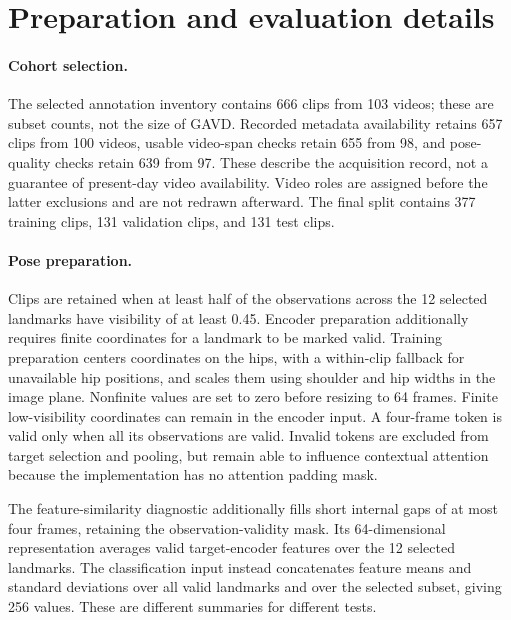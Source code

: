 \documentclass{article}
\begin{document}
\clearpage



\clearpage
\appendix
\section{Preparation and evaluation details}
\label{app:methods}

\paragraph{Cohort selection.}
The selected annotation inventory contains 666 clips from 103 videos; these are subset counts, not the size of GAVD. Recorded metadata availability retains 657 clips from 100 videos, usable video-span checks retain 655 from 98, and pose-quality checks retain 639 from 97. These describe the acquisition record, not a guarantee of present-day video availability. Video roles are assigned before the latter exclusions and are not redrawn afterward. The final split contains 377 training clips, 131 validation clips, and 131 test clips.

\paragraph{Pose preparation.}
Clips are retained when at least half of the observations across the 12 selected landmarks have visibility of at least 0.45. Encoder preparation additionally requires finite coordinates for a landmark to be marked valid. Training preparation centers coordinates on the hips, with a within-clip fallback for unavailable hip positions, and scales them using shoulder and hip widths in the image plane. Nonfinite values are set to zero before resizing to 64 frames. Finite low-visibility coordinates can remain in the encoder input. A four-frame token is valid only when all its observations are valid. Invalid tokens are excluded from target selection and pooling, but remain able to influence contextual attention because the implementation has no attention padding mask.

The feature-similarity diagnostic additionally fills short internal gaps of at most four frames, retaining the observation-validity mask. Its 64-dimensional representation averages valid target-encoder features over the 12 selected landmarks. The classification input instead concatenates feature means and standard deviations over all valid landmarks and over the selected subset, giving 256 values. These are different summaries for different tests.
\end{document}
